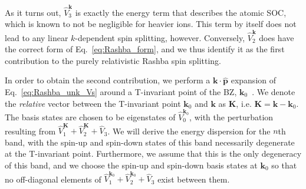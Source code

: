 As it turns out, $\hat{V}^{\bm k}_3$ is exactly the energy term that describes the atomic \gls{SOC}, which is known to not be negligible for heavier ions.
This term by itself does not lead to any linear $k$-dependent spin splitting, however.
Conversely, $\hat{V}_2^{\bm k}$ does have the correct form of Eq.~\eqref{eq:Rashba_form}, and we thus identify it as the first contribution to the purely relativistic Rashba spin splitting.
    
In order to obtain the second contribution, we perform a $\bm k \cdot \hat{\bm p}$ expansion of Eq.~\eqref{eq:Rashba_unk_Vs} around a \gls{T}-invariant point of the \gls{BZ}, $\bm k_0$~\cite{Rashba1959SymmetryAr,Lowdin1951,Bahramy2011}.
We denote the {\it relative} vector between the \gls{T}-invariant point $\bm k_0$ and $\bm k$ as $\bm K$, i.e. $\bm K = \bm k - \bm k_0$.
The basis states are chosen to be eigenstates of $\hat{V}_0^{\bm k_0}$, with the perturbation resulting from $\hat{V}^{\bm K}_1 + \hat{V}^{\bm K}_2 + \hat{V}_3$.
We will derive the energy dispersion for the $n$th band, with the spin-up and spin-down states of this band necessarily degenerate at the \gls{T}-invariant point.
Furthermore, we assume that this is the only degeneracy of this band, and we choose the spin-up and spin-down basis states at $\bm k_0$ so that no off-diagonal elements of $ \hat{V}_1^{\bm k_0} + \hat{V}_2^{\bm k_0} + \hat{V}_3$ exist between them.

